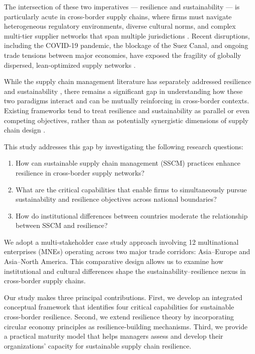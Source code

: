 \documentclass[12pt,a4paper,twoside]{article}
\begin{document}
The intersection of these two imperatives --- resilience and sustainability ---
is particularly acute in cross-border supply chains, where firms must navigate
heterogeneous regulatory environments, diverse cultural norms, and complex
multi-tier supplier networks that span multiple jurisdictions
\citep{wieland2021two}.  Recent disruptions, including the COVID-19 pandemic,
the blockage of the Suez Canal, and ongoing trade tensions between major
economies, have exposed the fragility of globally dispersed, lean-optimized
supply networks \citep{paul2021supply, queiroz2022impacts}.

While the supply chain management literature has separately addressed resilience
\citep{hohenstein2015research, kamalahmadi2016review} and sustainability
\citep{brandenburg2014quantitative, dubey2017sustainable}, there remains a
significant gap in understanding how these two paradigms interact and can be
mutually reinforcing in cross-border contexts.  Existing frameworks tend to
treat resilience and sustainability as parallel or even competing objectives,
rather than as potentially synergistic dimensions of supply chain design
\citep{fahimnia2015quantitative, negri2021integrating}.

This study addresses this gap by investigating the following research questions:

\begin{enumerate}
  \item How can sustainable supply chain management (SSCM) practices enhance
        resilience in cross-border supply networks?
  \item What are the critical capabilities that enable firms to simultaneously
        pursue sustainability and resilience objectives across national
        boundaries?
  \item How do institutional differences between countries moderate the
        relationship between SSCM and resilience?
\end{enumerate}

We adopt a multi-stakeholder case study approach involving 12 multinational
enterprises (MNEs) operating across two major trade corridors:
Asia--Europe and Asia--North America.  This comparative design allows us to
examine how institutional and cultural differences shape the
sustainability--resilience nexus in cross-border supply chains.

Our study makes three principal contributions.  First, we develop an integrated
conceptual framework that identifies four critical capabilities for sustainable
cross-border resilience.  Second, we extend resilience theory by incorporating
circular economy principles as resilience-building mechanisms.  Third, we
provide a practical maturity model that helps managers assess and develop their
organizations' capacity for sustainable supply chain resilience.
\end{document}

